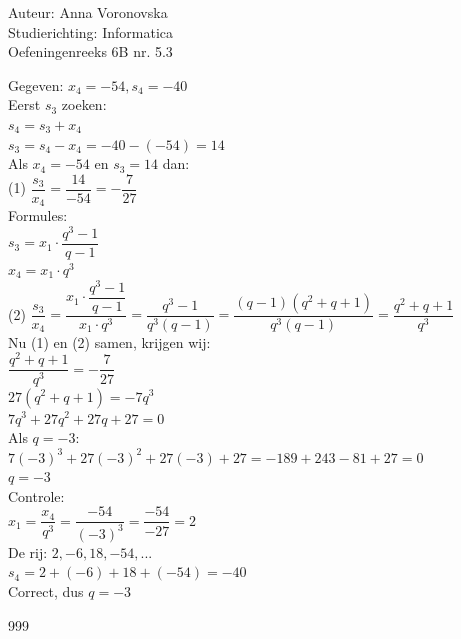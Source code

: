 \documentclass[a4paper]{article}
\begin{document}
  
\noindent \large Auteur: Anna Voronovska \\
\noindent \large Studierichting: Informatica\\
\noindent \large Oefeningenreeks 6B nr. 5.3\\

\medskip

\normalsize

Gegeven: $x_4 = -54, s_4 = -40$\\

Eerst $s_3$ zoeken:\\

$s_4 = s_3 + x_4$\\

$s_3 = s_4 - x_4 = -40 - (-54) = 14$\\

Als $x_4 = -54$ en $s_3 = 14$ dan:\\

(1) $\dfrac{s_3}{x_4} = \dfrac{14}{-54} = -\dfrac{7}{27} $\\

Formules:\\
 
$s_3 = x_1 \cdot \dfrac{q^3 - 1}{q - 1}$\\

$x_4 = x_1 \cdot q^3$\\

(2) $\dfrac{s_3}{x_4}
  = \dfrac{x_1 \cdot \dfrac{q^3-1}{q-1}}{x_1 \cdot q^3}
  = \dfrac{q^3 - 1}{q^3(q-1)}
  = \dfrac{(q-1)(q^2+q+1)}{q^3(q-1)}
  = \dfrac{q^2+q+1}{q^3}$\\

Nu (1) en (2) samen, krijgen wij:\\

$\dfrac{q^2+q+1}{q^3} = -\dfrac{7}{27}$\\

$27(q^2+q+1) = -7q^3$\\

$7q^3 + 27q^2 + 27q + 27 = 0$\\

Als $q = -3$:\\

$7(-3)^3 + 27(-3)^2 + 27(-3) + 27 = -189 + 243 - 81 + 27 = 0$\\

$q = -3$\\

Controle:\\

$x_1 = \dfrac{x_4}{q^3} = \dfrac{-54}{(-3)^3} = \dfrac{-54}{-27} = 2$\\

De rij: $2, -6, 18, -54, ...$\\

$s_4 = 2 + (-6) + 18 + (-54) = -40 $\\

Correct, dus $q=-3$


\begin{thebibliography}{999}
\end{thebibliography}
\end{document}
